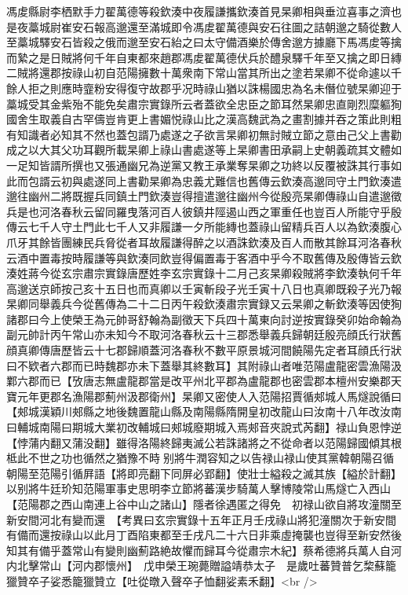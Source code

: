 馮䖍縣尉李栖默手力翟萬德等殺欽湊中夜履謙攜欽湊首見杲卿相與垂泣喜事之濟也是夜藁城尉崔安石報高邈還至滿城即令馮䖍翟萬德與安石往圖之詰朝邈之騎從數人至藁城驛安石皆殺之俄而邈至安石紿之曰太守備酒樂於傳舍邈方據廳下馬馮䖍等擒而縶之是日賊將何千年自東都來趙郡馮䖍翟萬德伏兵於醴泉驛千年至又擒之即日縳二賊將還郡按祿山初自范陽擁數十萬衆南下常山當其所出之塗若杲卿不從命遽以千餘人拒之則應時韲粉安得復守故郡乎况時祿山猶以誅楊國忠為名未僭位號杲卿迎于藁城受其金紫殆不能免矣肅宗實錄所云者蓋欲全忠臣之節耳然杲卿忠直剛烈糜軀狥國舍生取義自古罕儔豈肯更上書媚悦祿山比之漢高魏武為之畫割據并吞之策此則粗有知識者必知其不然也蓋包諝乃處遂之子欲言杲卿初無討賊立節之意由己父上書勸成之以大其父功耳觀所載杲卿上祿山書處遂等上杲卿書田承嗣上史朝義疏其文體如一足知皆諝所撰也又張通幽兄為逆黨又教王承業奪杲卿之功終以反覆被誅其行事如此而包諝云初與處遂同上書勸杲卿為忠義尤難信也舊傳云欽湊高邈同守土門欽湊遣邈往幽州二將既握兵同鎮土門欽湊豈得擅遣邈往幽州今從殷亮杲卿傳祿山自遣邈徵兵是也河洛春秋云留同羅曳落河百人彼鎮井陘遏山西之軍重任也豈百人所能守乎殷傳云七千人守土門此七千人又非履謙一夕所能縳也蓋祿山留精兵百人以為欽湊腹心爪牙其餘皆團練民兵脅從者耳故履謙得醉之以酒誅欽湊及百人而散其餘耳河洛春秋云酒中置毒按時履謙等與欽湊同飲豈得偏置毒于客酒中乎今不取舊傳及殷傳皆云欽湊姓蔣今從玄宗肅宗實錄唐歷姓李玄宗實錄十二月己亥杲卿殺賊將李欽湊執何千年高邈送京師按己亥十五日也而真卿以壬寅斬段子光壬寅十八日也真卿既殺子光乃報杲卿同舉義兵今從舊傳為二十二日丙午殺欽湊肅宗實録又云杲卿之斬欽湊等因使狥諸郡曰今上使榮王為元帥哥舒翰為副徵天下兵四十萬東向討逆按實錄癸卯始命翰為副元帥計丙午常山亦未知今不取河洛春秋云十三郡悉舉義兵歸朝廷殷亮顔氏行狀舊顔真卿傳唐歷皆云十七郡歸順蓋河洛春秋不數平原景城河間饒陽先定者耳顔氏行狀曰不欵者六郡而已時魏郡亦未下蓋舉其終數耳】其附祿山者唯范陽盧龍密雲漁陽汲鄴六郡而已【攷唐志無盧龍郡當是改平州北平郡為盧龍郡也密雲郡本檀州安樂郡天寶元年更郡名漁陽郡薊州汲郡衛州】杲卿又密使人入范陽招賈循郟城人馬燧說循曰【郟城漢穎川郟縣之地後魏置龍山縣及南陽縣隋開皇初改龍山曰汝南十八年改汝南曰輔城南陽曰期城大業初改輔城曰郟城廢期城入焉郟音夾說式芮翻】禄山負恩悖逆【悖蒲内翻又蒲没翻】雖得洛陽終歸夷滅公若誅諸將之不從命者以范陽歸國傾其根柢此不世之功也循然之猶豫不時别將牛潤容知之以告禄山禄山使其黨韓朝陽召循朝陽至范陽引循屛語【將即亮翻下同屏必郢翻】使壯士縊殺之滅其族【縊於計翻】以别將牛廷玠知范陽軍事史思明李立節將蕃漢步騎萬人擊博陵常山馬燧亡入西山【范陽郡之西山南連上谷中山之諸山】隱者徐遇匿之得免　初禄山欲自將攻潼關至新安間河北有變而還　【考異曰玄宗實錄十五年正月壬戌祿山將犯潼關次于新安間有備而還按祿山以此月丁酉陷東都至壬戌凡二十六日非乘虛掩襲也豈得至新安然後知其有備乎蓋常山有變則幽薊路絶故懼而歸耳今從肅宗木紀】蔡希德將兵萬人自河内北擊常山【河内郡懷州】　戊申榮王琬薨贈謚靖恭太子　是歲吐蕃贊普乞棃蘇籠獵贊卒子娑悉籠獵贊立【吐從暾入聲卒子恤翻娑素禾翻】<br />
